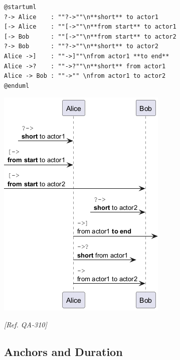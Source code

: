 \begin{verbatim}
@startuml
?-> Alice    : ""?->""\n**short** to actor1
[-> Alice    : ""[->""\n**from start** to actor1
[-> Bob      : ""[->""\n**from start** to actor2
?-> Bob      : ""?->""\n**short** to actor2
Alice ->]    : ""->]""\nfrom actor1 **to end**
Alice ->?    : ""->?""\n**short** from actor1
Alice -> Bob : ""->"" \nfrom actor1 to actor2
@enduml
\end{verbatim}
\begin{center}
\includegraphics[scale=0.60]{imgw/img-b9cde1bd1c7484ac43dcc31caa2b86d3.png}
\end{center}


\textit{[Ref. QA-310]}
%
%
\subsection{Anchors and Duration}






